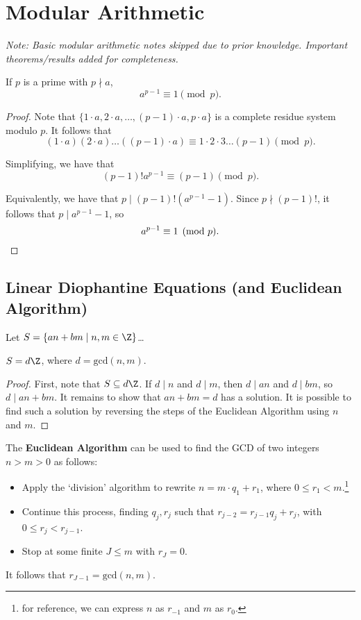 \documentclass[11pt]{article}
\begin{document}
\newpage

\section{Modular Arithmetic}

\textit{Note: Basic modular arithmetic notes skipped due to prior knowledge. Important theorems/results added for completeness.}

\begin{theorem}
If $p$ is a prime with $p \nmid a$, 
\[
    a^{p-1} \equiv 1 \pmod p.
\]
\end{theorem}

\begin{proof}
Note that $\{ 1\cdot a, 2\cdot a, \dots, (p-1)\cdot a, p\cdot a\}$
is a complete residue system modulo $p$. It follows that
\[
    (1\cdot a)(2\cdot a) \dots ((p-1) \cdot a) \equiv 1\cdot 2\cdot 3 \dots (p-1) \pmod p.
\]

Simplifying, we have that
\[
    (p-1)! a^{p-1} \equiv (p-1) \pmod p.
\]

Equivalently, we have that $p \mid (p-1)! \left( a^{p-1} - 1 \right).$ Since $p \nmid (p-1)!$, it follows that $p \mid a^{p-1} - 1$, so 
\[
    a^{p-1} \equiv 1 \pmod p. \qedhere
\]
\end{proof}

\subsection{Linear Diophantine Equations (and Euclidean Algorithm)}
Let $S = \{  an + bm \mid n, m \in \Z \}$\dots
\begin{theorem}
$S = d\Z$, where $d = \mathrm{gcd}(n, m).$  
\end{theorem}

\begin{proof}
First, note that $S \subseteq d\Z$. If $d \mid n$ and $d \mid m$, then $d \mid an$ and $d \mid bm$, so $d \mid an + bm$. 
It remains to show that $an + bm = d$ has a solution. It is possible to find such a solution by reversing the steps of the Euclidean Algorithm using $n$ and $m$.
\end{proof}

\begin{theorem}
The \textbf{Euclidean Algorithm} can be used to find the GCD of two integers $n > m > 0$ as follows:
\begin{itemize}
    \item Apply the `division' algorithm to rewrite $n = m \cdot q_1 + r_1$, where $0 \leq r_1 < m$.\footnote{for reference, we can express $n$ as $r_{-1}$ and $m$ as $r_0$.}
    \item Continue this process, finding $q_j, r_j$ such that $r_{j-2} = r_{j-1} q_j + r_j$, with $0 \leq r_j < r_{j-1}$.
    \item Stop at some finite $J \leq m$ with $r_J = 0$.
\end{itemize}

It follows that $r_{J-1} = \mathrm{gcd}(n, m).$ 
\end{theorem}
\end{document}
